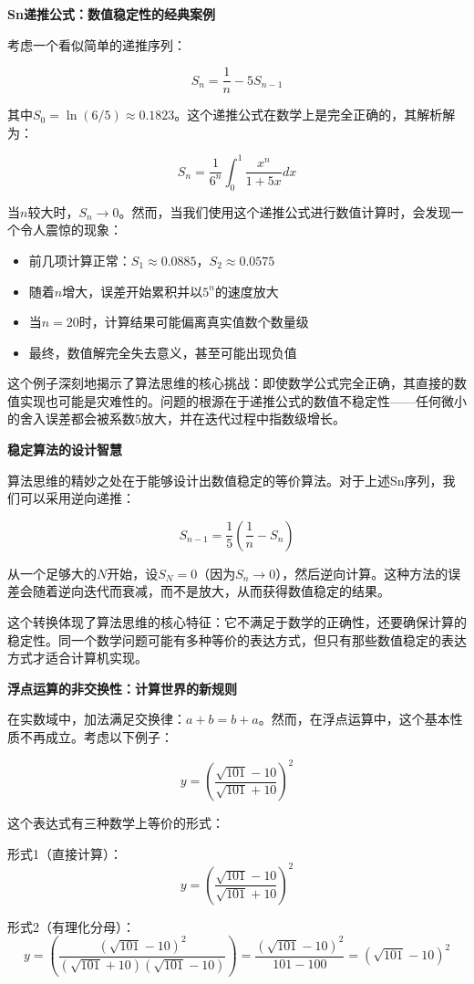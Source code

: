 \textbf{Sn递推公式：数值稳定性的经典案例}

考虑一个看似简单的递推序列：

$$S_n = \frac{1}{n} - 5S_{n-1}$$

其中$S_0 = \ln(6/5) \approx 0.1823$。这个递推公式在数学上是完全正确的，其解析解为：

$$S_n = \frac{1}{6^n} \int_0^1 \frac{x^n}{1+5x} dx$$

当$n$较大时，$S_n \to 0$。然而，当我们使用这个递推公式进行数值计算时，会发现一个令人震惊的现象：

\begin{itemize}
\item 前几项计算正常：$S_1 \approx 0.0885$，$S_2 \approx 0.0575$
\item 随着$n$增大，误差开始累积并以$5^n$的速度放大
\item 当$n=20$时，计算结果可能偏离真实值数个数量级
\item 最终，数值解完全失去意义，甚至可能出现负值
\end{itemize}

这个例子深刻地揭示了算法思维的核心挑战：即使数学公式完全正确，其直接的数值实现也可能是灾难性的。问题的根源在于递推公式的数值不稳定性——任何微小的舍入误差都会被系数5放大，并在迭代过程中指数级增长。

\textbf{稳定算法的设计智慧}

算法思维的精妙之处在于能够设计出数值稳定的等价算法。对于上述Sn序列，我们可以采用逆向递推：

$$S_{n-1} = \frac{1}{5}\left(\frac{1}{n} - S_n\right)$$

从一个足够大的$N$开始，设$S_N = 0$（因为$S_n \to 0$），然后逆向计算。这种方法的误差会随着逆向迭代而衰减，而不是放大，从而获得数值稳定的结果。

这个转换体现了算法思维的核心特征：它不满足于数学的正确性，还要确保计算的稳定性。同一个数学问题可能有多种等价的表达方式，但只有那些数值稳定的表达方式才适合计算机实现。

\textbf{浮点运算的非交换性：计算世界的新规则}

在实数域中，加法满足交换律：$a + b = b + a$。然而，在浮点运算中，这个基本性质不再成立。考虑以下例子：

$$y = \left(\frac{\sqrt{101} - 10}{\sqrt{101} + 10}\right)^2$$

这个表达式有三种数学上等价的形式：

形式1（直接计算）：
$$y = \left(\frac{\sqrt{101} - 10}{\sqrt{101} + 10}\right)^2$$

形式2（有理化分母）：
$$y = \left(\frac{(\sqrt{101} - 10)^2}{(\sqrt{101} + 10)(\sqrt{101} - 10)}\right) = \frac{(\sqrt{101} - 10)^2}{101 - 100} = (\sqrt{101} - 10)^2$$

